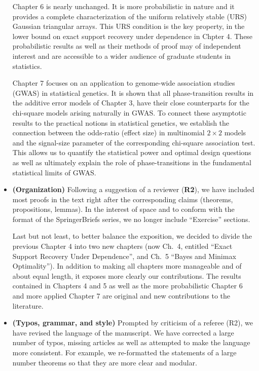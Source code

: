 \documentclass[11pt]{article}
\begin{document}
\begin{itemize}
   Chapter 6 is nearly unchanged. It is more probabilistic in nature and it provides a complete characterization of the uniform relatively stable (URS) Gaussian 
   triangular arrays.  This URS condition is the key property, in the lower bound on exact support recovery under dependence in Chpter 4. 
   These probabilistic results as well as their methods of proof may of independent interest and are accessible to a wider audience of graduate students in statistics. 
   
   Chapter 7 focuses on an application to genome-wide association studies (GWAS) in statistical genetics.  It is shown that all phase-transition results in the 
    additive error models of Chapter 3, have their close counterparts for the chi-square models arising naturally in GWAS. To connect these
    asymptotic results to the practical notions in statistical genetics, we establish the connection between the odds-ratio (effect size) in multinomial 
    $2\times 2$ models
    and the signal-size parameter of the corresponding chi-square association test.  This allows us to quantify the statistical power and
     optimal design questions as well as ultimately explain the role of phase-transitions in the fundamental statistical limits of GWAS.
    
  
 
  \item {\bf (Organization)} Following a suggestion of a reviewer ({\bf R2}),  we have included most proofs 
  in the text right after the corresponding claims (theorems, propositions, lemmas).  In the interest of space and to conform with the format of
  the SpringerBriefs series, we no longer include ``Exercise'' sections. 
  
  Last but not least, to better balance the exposition, we decided to divide the previous
  Chapter 4 into two new chapters (now Ch.\ 4, entitled ``Exact Support Recovery Under Dependence'', 
  and Ch.\ 5 ``Bayes and Minimax Optimality'').  In addition to making all chapters more manageable and of about equal length, it exposes more
  clearly our contributions.  The results contained in Chapters 4 and 5 as well as the more probabilistic Chapter 6 and more applied Chapter 7 are 
  original and new contributions to the literature.
  
  \item {\bf (Typos, grammar, and style)}  Prompted by criticism of a referee (R2), we have revised the language of the manuscript. 
  We have corrected a large number of typos, missing articles as well as attempted to make the language more consistent.  For example, 
  we re-formatted the statements of a large number theorems so that they are more clear and modular. 


\end{itemize}
\end{document}
